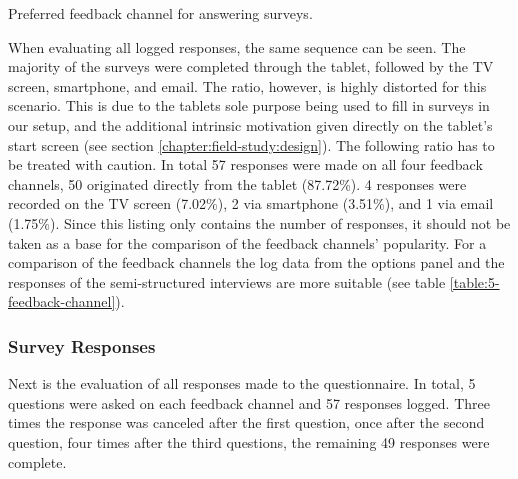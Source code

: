 	\begin{table}[h]
		\small
		\center
		
		\caption[Feedback Channel]{Preferred feedback channel for answering surveys.}
		\label{table:5-feedback-channel}
	\end{table}


	When evaluating all logged responses, the same sequence can be seen. The majority of the surveys were completed through the tablet, followed by the TV screen, smartphone, and email. The ratio, however, is highly distorted for this scenario. This is due to the tablets sole purpose being used to fill in surveys in our setup, and the additional intrinsic motivation given directly on the tablet's start screen (see section \ref{chapter:field-study:design}). The following ratio has to be treated with caution. In total 57 responses were made on all four feedback channels, 50 originated directly from the tablet (87.72\%). 4 responses were recorded on the TV screen (7.02\%), 2 via smartphone (3.51\%), and 1 via email (1.75\%). Since this listing only contains the number of responses, it should not be taken as a base for the comparison of the feedback channels' popularity. %
	For a comparison of the feedback channels the log data from the options panel and the responses of the semi-structured interviews are more suitable (see table \ref{table:5-feedback-channel}).




	\subsubsection{Survey Responses}
	\label{5:results:survey}

	Next is the evaluation of all responses made to the questionnaire. In total, 5 questions were asked on each feedback channel and 57 responses logged. Three times the response was canceled after the first question, once after the second question, four times after the third questions, the remaining 49 responses were complete.

